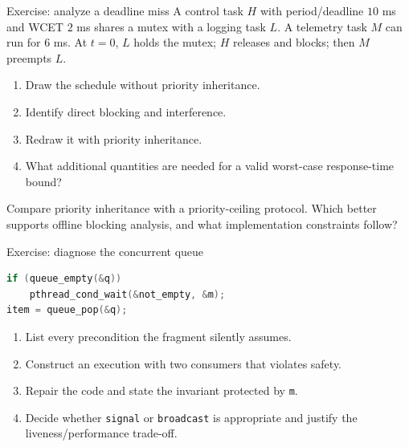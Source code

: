 \documentclass[aspectratio=169,11pt]{beamer}
\newcommand{\code}[1]{\texttt{#1}}
\begin{document}
\begin{frame}{Exercise: analyze a deadline miss}
  A control task $H$ with period/deadline $10$ ms and WCET $2$ ms shares a mutex with a logging task $L$. A telemetry task $M$ can run for $6$ ms. At $t=0$, $L$ holds the mutex; $H$ releases and blocks; then $M$ preempts $L$.
  \begin{enumerate}
    \item Draw the schedule without priority inheritance.
    \item Identify direct blocking and interference.
    \item Redraw it with priority inheritance.
    \item What additional quantities are needed for a valid worst-case response-time bound?
  \end{enumerate}
  \begin{tcolorbox}[title=Extension]
    Compare priority inheritance with a priority-ceiling protocol. Which better supports offline blocking analysis, and what implementation constraints follow?
  \end{tcolorbox}
\end{frame}

\begin{frame}[fragile]{Exercise: diagnose the concurrent queue}
\begin{lstlisting}[language=C]
if (queue_empty(&q))
    pthread_cond_wait(&not_empty, &m);
item = queue_pop(&q);
\end{lstlisting}
  \begin{enumerate}
    \item List every precondition the fragment silently assumes.
    \item Construct an execution with two consumers that violates safety.
    \item Repair the code and state the invariant protected by \code{m}.
    \item Decide whether \code{signal} or \code{broadcast} is appropriate and justify the liveness/performance trade-off.
  \end{enumerate}
\end{frame}
\end{document}
